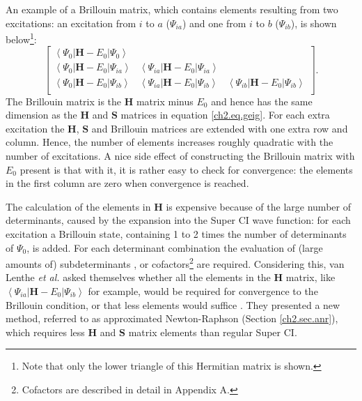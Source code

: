 An example of a Brillouin matrix, which contains elements resulting from two excitations: an excitation from $i$ to $a$ ($\Psi_{ia}$) and one from $i$ to $b$ ($\Psi_{ib}$), is shown below\footnote{Note that only the lower triangle of this Hermitian matrix is shown.}:
\begin{equation}
\left[\begin{array}{ccc}
\left< \Psi_{0} | \mathbf{H}-E_0 | \Psi_{0} \right> & & \\
\left< \Psi_{0} | \mathbf{H}-E_0 | \Psi_{ia} \right> & \left< \Psi_{ia} | \mathbf{H}-E_0 | \Psi_{ia} \right> &\\
\left< \Psi_{0} | \mathbf{H}-E_0 | \Psi_{ib} \right> & \left< \Psi_{ia} | \mathbf{H}-E_0 | \Psi_{ib} \right> & \left< \Psi_{ib} | \mathbf{H}-E_0 | \Psi_{ib} \right> \\
\end{array}\right].
\label{ch2.eq.hamilt}
\end{equation}
The Brillouin matrix is the $\mathbf{H}$ matrix minus $E_0$ \cite{koos1} and hence has the same dimension as the $\mathbf{H}$ and $\mathbf{S}$ matrices in equation \ref{ch2.eq.geig}. For each extra excitation the $\mathbf{H}$, $\mathbf{S}$ and Brillouin matrices are extended with one extra row and column. Hence, the number of elements increases roughly quadratic with the number of excitations. A nice side effect of constructing the Brillouin matrix with $E_0$ present is that with it, it is rather easy to check for convergence: the elements in the first column are zero when convergence is reached.

The calculation of the elements in $\mathbf{H}$ is expensive because of the large number of determinants, caused by the expansion into the Super CI wave function: for each excitation a Brillouin state, containing 1 to 2 times the number of determinants of $\Psi_0$, is added. For each determinant combination the evaluation of (large amounts of) subdeterminants \cite{koos2}, or cofactors\footnote{Cofactors are described in detail in Appendix A.} are required. Considering this, van Lenthe \textit{et al.} asked themselves whether all the elements in the $\mathbf{H}$ matrix, like $\left < \Psi_{ia} | \mathbf{H} - E_0 | \Psi_{ib} \right >$ for example, would be required for convergence to the Brillouin condition, or that less elements would suffice \cite{koos1}. They presented a new method, referred to as approximated Newton-Raphson (Section \ref{ch2.sec.anr}), which requires less $\mathbf{H}$ and $\mathbf{S}$ matrix elements than regular Super CI.

